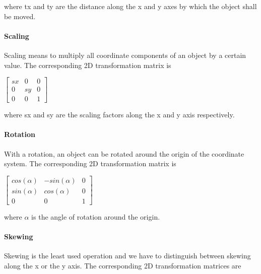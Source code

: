 where tx and ty are the distance along the x and y axes by which the object shall be moved.

\paragraph{Scaling}
Scaling means to multiply all coordinate components of an object by a certain value.
The corresponding 2D transformation matrix is

\hspace*{0.4cm}
\begin{center}
\begin{math}\left[ \begin{array}{ccc} sx & 0 & 0 \\ 0 & sy & 0 \\ 0 & 0 & 1\end{array}\right]\end{math}
\end{center}
\hspace*{0.4cm}

where sx and sy are the scaling factors along the x and y axis respectively.

\paragraph{Rotation}
With a rotation, an object can be rotated around the origin of the coordinate system.
The corresponding 2D transformation matrix is

\hspace*{0.4cm}
\begin{center}
\begin{math}\left[ \begin{array}{ccc} cos(\alpha) & -sin(\alpha) & 0 \\ sin(\alpha) & cos(\alpha) & 0 \\ 0 & 0 & 1\end{array}\right]\end{math}
\end{center}
\hspace*{0.4cm}

where $\alpha$ is the angle of rotation around the origin.

\paragraph{Skewing}
Skewing is the least used operation and we have to distinguish between skewing along the x or the y axis.
The corresponding 2D transformation matrices are

